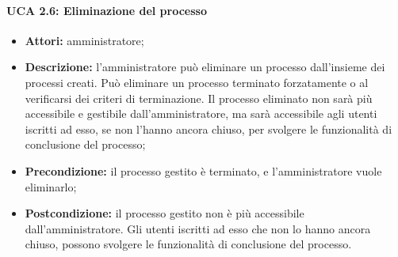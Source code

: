 \paragraph{UCA 2.6: Eliminazione del processo}
\begin{itemize}
\item \textbf{Attori:} amministratore;
\item \textbf{Descrizione:} 
l'amministratore può eliminare un processo dall'insieme dei processi creati.
Può eliminare un processo terminato forzatamente o al verificarsi dei criteri di terminazione.
Il processo eliminato non sarà più accessibile e gestibile dall'amministratore, ma sarà accessibile agli utenti iscritti ad esso, se non l'hanno ancora chiuso, per svolgere le funzionalità di conclusione del processo;
\item \textbf{Precondizione:} 
il processo gestito è terminato, e l'amministratore vuole eliminarlo;
\item \textbf{Postcondizione:} 
il processo gestito non è più accessibile dall'amministratore. Gli utenti iscritti ad esso che non lo hanno ancora chiuso, possono svolgere le funzionalità di conclusione del processo.
\end{itemize}